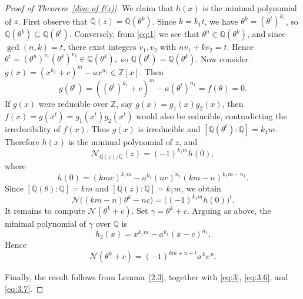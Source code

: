 \documentclass[table]{amsart}
\numberwithin{equation}{section}
\begin{document}
\begin{proof}[Proof of Theorem~\ref{disc of f(x)}]
We claim that $h(x)$ is the minimal polynomial of $z$. 
First observe that $\mathbb{Q}(z)=\mathbb{Q}(\theta^k)$. 
Since $k=k_1t$, we have $\theta^k=(\theta^t)^{k_1}$, so 
$\mathbb{Q}(\theta^k)\subseteq\mathbb{Q}(\theta^t)$. 
Conversely, from \eqref{eq:1} we see that $\theta^n\in\mathbb{Q}(\theta^k)$, 
and since $\gcd(n,k)=t$, there exist integers $v_1,v_2$ with 
$nv_1+kv_2=t$. Hence $\theta^t=(\theta^n)^{v_1}(\theta^k)^{v_2}\in\mathbb{Q}(\theta^k),$ so $\mathbb{Q}(\theta^t)=\mathbb{Q}(\theta^k)$. Now consider $g(x)=(x^{k_1}+c)^m-ax^{n_1}\in\mathbb{Z}[x].$ Then
\[
g(\theta^t)=((\theta^t)^{k_1}+c)^m-a(\theta^t)^{n_1}
=f(\theta)=0.
\]
If $g(x)$ were reducible over $\mathbb{Z}$, say 
$g(x)=g_1(x)g_2(x)$, then
$f(x)=g(x^t)=g_1(x^t)g_2(x^t)$ would also be reducible, contradicting the irreducibility of $f(x)$. Thus $g(x)$ is irreducible and $[\mathbb{Q}(\theta^t):\mathbb{Q}]=k_1m.$ Therefore $h(x)$ is the minimal polynomial of $z$, and
\[
\mathcal{N}_{\mathbb{Q}(z)/\mathbb{Q}}(z)
=
(-1)^{k_1m}h(0),
\]
where
\[
h(0)
=
(kmc)^{k_1m}
-
a^{k_1}(nc)^{n_1}(km-n)^{k_1m-n_1}.
\]
Since $[\mathbb{Q}(\theta):\mathbb{Q}]=km$ and 
$[\mathbb{Q}(z):\mathbb{Q}]=k_1m$, we obtain
\begin{equation}\label{eq:3.6}
\mathcal{N}\bigl((km-n)\theta^k-nc\bigr)
=
\bigl((-1)^{k_1m}h(0)\bigr)^t.
\end{equation}
It remains to compute $\mathcal{N}(\theta^k+c)$. Set $\gamma=\theta^k+c$. Arguing as above, the minimal polynomial of $\gamma$ over $\mathbb{Q}$ is
\[
h_2(x)=x^{k_1m}-a^{k_1}(x-c)^{n_1}.
\]
Hence
\begin{equation}\label{eq:3.7}
\mathcal{N}(\theta^k+c)
=
(-1)^{km+n+t}a^{\,k}c^{\,n}.
\end{equation}

Finally, the result follows from Lemma~\ref{2.3}, together with 
\eqref{eq:3}, \eqref{eq:3.6}, and \eqref{eq:3.7}.
\end{proof}
\end{document}
